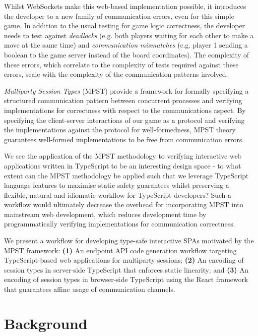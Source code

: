 \documentclass[12pt,twoside]{report}
\begin{document}
Whilst WebSockets make this web-based implementation possible, it introduces the developer to a new family of communication errors, even for this simple game. In addition to the usual testing for game logic correctness, the developer needs to test against \textit{deadlocks} (e.g. both players waiting for each other to make a move at the same time) and \textit{communication mismatches} (e.g. player 1 sending a boolean to the game server instead of the board coordinates). The complexity of these errors, which correlate to the complexity of tests required against these errors, scale with the complexity of the communication patterns involved.

\textit{Multiparty Session Types} (MPST) \cite{MPST} provide a framework for formally specifying a structured communication pattern between concurrent processes and verifying implementations for correctness with respect to the communications aspect. By specifying the client-server interactions of our game as a protocol and verifying the implementations against the protocol for well-formedness, MPST theory guarantees well-formed implementations to be free from communication errors.

We see the application of the MPST methodology to verifying interactive web applications written in TypeScript to be an interesting design space - to what extent can the MPST methodology be applied such that we leverage TypeScript language features to maximise static safety guarantees whilst preserving a flexible, natural and idiomatic workflow for TypeScript developers? Such a workflow would ultimately decrease the overhead for incorporating MPST into mainstream web development, which reduces development time by programmatically verifying implementations for communication correctness.

We present a workflow for developing type-safe interactive SPAs motivated by the MPST framework: \textbf{(1)} An endpoint API code generation workflow targeting TypeScript-based web applications for multiparty sessions; \textbf{(2)} An encoding of session types in server-side TypeScript that enforces static linearity; and \textbf{(3)} An encoding of session types in browser-side TypeScript using the React framework that guarantees affine usage of communication channels.

\chapter{Background}

 
\end{document}
